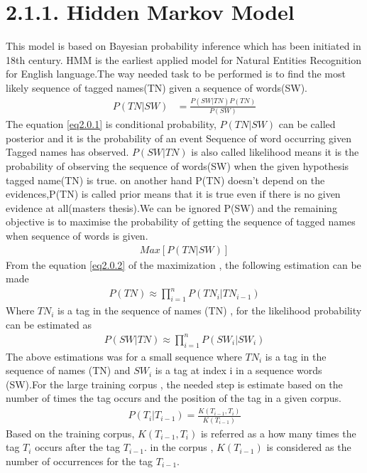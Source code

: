 \section*{2.1.1. Hidden Markov Model}
This model is based on Bayesian probability inference which has been initiated in 18th century. HMM is the earliest applied model for Natural Entities Recognition for English language.The way needed task to be performed is to find the most likely sequence of tagged names(TN) given a sequence of words(SW).
\begin{align}
P(TN|SW) & = \frac{P(SW|TN)P(TN)}{P(SW)}\label{eq2.0.1}
\end{align}
The equation  \eqref{eq2.0.1} is conditional probability, $P(TN|SW)$ can be  called posterior and it is  the probability of an event Sequence of word occurring given Tagged names has observed. 
$P(SW|TN)$ is also called likelihood means it is the probability of observing the sequence of words(SW) when the given hypothesis tagged name(TN) is true. on another hand P(TN) doesn't depend on the evidences,P(TN) is called prior means that it is true even if there is no given evidence at all(masters thesis).We can be ignored P(SW) and the remaining objective is to maximise the probability of getting the sequence of tagged names when sequence of words is given.
\begin{align}
Max\left[P(TN|SW)\right] \label{eq2.0.2}
\end{align}
From the equation  \eqref{eq2.0.2} of the maximization , the following estimation can be made
\begin{align}
P(TN){\approx} \prod_{i=1}^{n} P({TN}_{i}|{TN}_{i-1}) \label{2.0.3}
\end{align}
Where ${TN}_{i}$ is a tag in the sequence of names (TN) , for the likelihood probability can be estimated as 
\begin{align}
P(SW|TN){\approx} \prod_{i=1}^{n} P({SW}_{i}|{SW}_{i})\label{2.0.4}
\end{align}
The above estimations was for a small sequence where ${TN}_{i}$ is a tag in the sequence of names (TN) and ${SW}_{i}$ is a tag at index i in a sequence words (SW).For the large training corpus , the needed step is estimate based on the number of times the tag occurs and the position of the tag in a given corpus.
\begin{align}
P(T_{i}|T_{i-1}) = \frac{K(T_{i-1},T_{i})}{K(T_{i-1})}\label{2.0.5}
\end{align}
Based on the training corpus, $K(T_{i-1},T_{i})$ is referred as a how many times the tag $T_{i}$ occurs after the tag $T_{i-1}$. in the corpus , $K(T_{i-1})$ is considered as the number of occurrences for the tag $T_{i-1}$.

